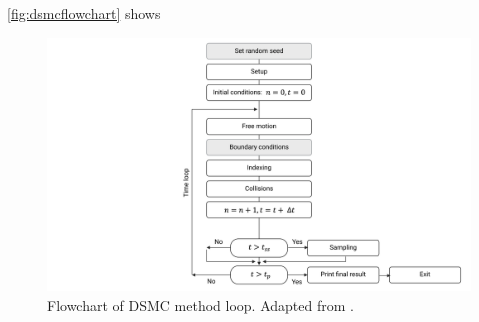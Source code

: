 \autoref{fig:dsmcflowchart} shows 

\begin{figure}[ht]
    \centering
    \includegraphics[width=\textwidth]{../Images/3. Methodology/dsmcflowchart.pdf}
    \caption{Flowchart of DSMC method loop. Adapted from \cite{dsmcnotes}.}
    \label{fig:dsmcflowchart}
\end{figure}